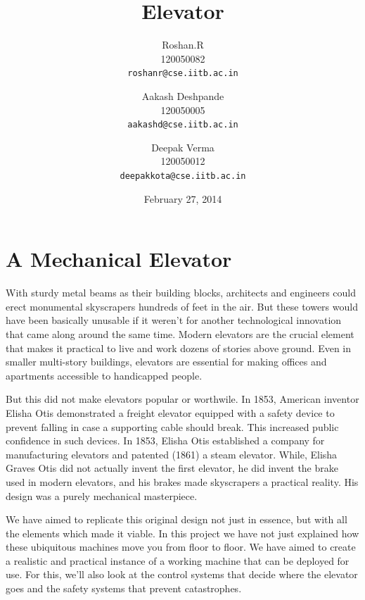\documentclass[a4paper,11pt]{article}
\begin{document}
\date{February 27, 2014}

\title{Elevator}

\author{Roshan.R\\
120050082\\
\texttt{roshanr@cse.iitb.ac.in}\\
\and Aakash Deshpande\\
120050005\\
\texttt{aakashd@cse.iitb.ac.in}\\
\and Deepak Verma\\
120050012\\
\texttt{deepakkota@cse.iitb.ac.in}}

\maketitle

\section{A Mechanical Elevator}

With sturdy metal beams as their building blocks, architects and engineers could erect monumental skyscrapers hundreds of feet in the air. But these towers would have been basically unusable if it weren't for another technological innovation that came along around the same time. Modern elevators are the crucial element that makes it practical to live and work dozens of stories above ground. Even in smaller multi-story buildings, elevators are essential for making offices and apartments accessible to handicapped people.

But this did not make elevators popular or worthwile. In 1853, American inventor Elisha Otis demonstrated a freight elevator equipped with a safety device to prevent falling in case a supporting cable should break. This increased public confidence in such devices. In 1853, Elisha Otis established a company for manufacturing elevators and patented (1861) a steam elevator. While, Elisha Graves Otis did not actually invent the first elevator, he did invent the brake used in modern elevators, and his brakes made skyscrapers a practical reality. His design was a purely mechanical masterpiece.

We have aimed to replicate this original design not just in essence, but with all the elements which made it viable.
In this project we have not just explained how these ubiquitous machines move you from floor to floor. We have aimed to create a realistic and practical instance of a working machine that can be deployed for use. For this, we'll also look at the control systems that decide where the elevator goes and the safety systems that prevent catastrophes.	
\end{document}
